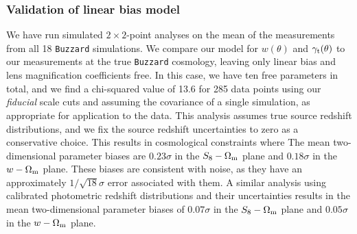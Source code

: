 \documentclass[aps, prd,twocolumn,superscriptaddress,nofootinbib,preprintnumbers]{revtex4-1}
\newcommand{\buzzard}{\texttt{Buzzard} }
\begin{document}
\subsubsection{Validation of linear bias model}
We have run simulated $2\times 2$-point analyses on the mean of the measurements from all 18 \buzzard simulations. We compare our model for $w(\theta)$ and $\gamma_{\rm t}(\theta)$ to our measurements at the true \buzzard cosmology, leaving only linear bias and lens magnification coefficients free. In this case, we have ten free parameters in total, and we find a chi-squared value of 13.6 for 285 data points using our \textit{fiducial} scale cuts and assuming the covariance of a single simulation, as appropriate for application to the data. This analysis assumes true source redshift distributions, and we fix the source redshift uncertainties to zero as a conservative choice. This results in cosmological constraints where The mean two-dimensional parameter biases are $0.23\sigma$ in the $S_8-\Omega_{\rm m}$ plane and $0.18\sigma$ in the $w-\Omega_{\rm m}$ plane. These biases are consistent with noise, as they have an approximately $1/\sqrt{18}\sigma$ error associated with them. A similar analysis using calibrated photometric redshift distributions and their uncertainties results in the mean two-dimensional parameter biases of $0.07\sigma$ in the $S_8-\Omega_{\rm m}$ plane and $0.05\sigma$ in the $w-\Omega_{\rm m}$ plane.

\end{document}
